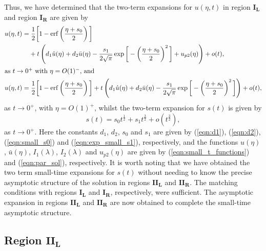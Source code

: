 \documentclass[11pt,a4paper]{article}
\newcommand{\eeref}[1]{(\ref{eqn:#1})}
\newcommand{\eelab}[1]{\label{eqn:#1}}
\def\beq{\begin{equation}}
\def\eeq{\end{equation}}
\DeclareMathOperator\erf{erf}
\begin{document}
Thus, we have determined that the two-term expansions for $u(\eta, t)$ in region $\mathbf{I_L}$ and region $\mathbf{I_R}$ are given by
\begin{align}
u(\eta,t)  =  & \; \frac{1}{2} \bigg[ 1 - \erf \left( \frac{\eta+ s_0}{2} \right) \bigg] 
\nonumber \\
& +  t \left( d_1 \hat{u}(\eta)   + d_2 \bar{u}(\eta)  -  \frac{s_1}{2 \sqrt{\pi}} \exp \bigg[ - \left( \frac{\eta + s_0}{2} \right)^2 \bigg] + u_{p2}(\eta) \right) + o(t),  \eelab{par_sol_1l_full} \\
\intertext{as $t \to 0^+$ with $\eta = O(1)^-$, and }
u(\eta,t)  =  & \; \frac{1}{2} \bigg[ 1 - \erf \left( \frac{\eta+ s_0}{2} \right)\bigg] + t \left( d_1 \hat{u}(\eta)   + d_2 \bar{u}(\eta)  -  \frac{s_1}{2 \sqrt{\pi}} \exp \bigg[ - \left( \frac{\eta + s_0}{2} \right)^2 \bigg] \right) + o(t),   \eelab{par_sol_1r_full}
\end{align} 
as $t \to 0^+$, with $\eta = O(1)^+$, whilst the
  two-term expansion for $s(t)$ is given by 
\beq
s(t) = s_0 t^{\frac{1}{2}} + s_1 t^{\frac{3}{2}} + o(t^{\frac{3}{2}}) , \eelab{exp_small_s_full}
\eeq
as $t \to 0^+$. Here the constants $d_1$, $d_2$, $s_0$ and $s_1$ are given by \eeref{d1}, \eeref{d2}, \eeref{small_s0} and \eeref{exp_small_s1}, respectively, and the functions $\hat{u}(\eta)$, $\bar{u}(\eta)$, $I_1(\lambda)$, $I_2(\lambda)$ and $u_{p2}(\eta)$ are given by \eeref{small_t_functions} and \eeref{par_sol}, respectively. 
%
It is worth noting that we have obtained the two term small-time expansions for $s(t)$ without needing to know the precise asymptotic structure of the solution in regions $\mathbf{II_L}$ and $\mathbf{II_R}$. The matching conditions with regions $\mathbf{I_L}$ and $\mathbf{I_R}$, respectively, were sufficient. The asymptotic expansion in regions $\mathbf{II_L}$ and $\mathbf{II_R}$ are now obtained to complete the small-time asymptotic structure.
 

\subsection{Region  $\mathbf{II_L}$} 
\end{document}
